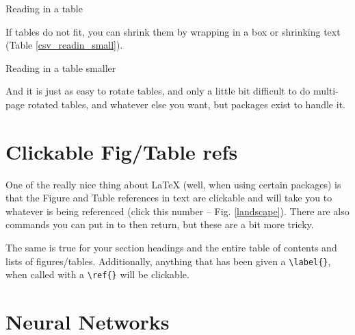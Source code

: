 \begin{table}[h]
\centering
\caption[Normal size table]{Reading in a table}
\label{csv_readin}
\end{table}

If tables do not fit, you can shrink them by wrapping in a box or shrinking text (Table \ref{csv_readin_small}).

\begin{table}[h]
\centering
\caption[Tiny table]{Reading in a table smaller}
\label{csv_readin_small}
\end{table}

And it is just as easy to rotate tables, and only a little bit difficult to do multi-page rotated tables, and whatever else you want, but packages exist to handle it. 

\clearpage %

\section{Clickable Fig/Table refs}

One of the really nice thing about \LaTeX{} (well, when using certain packages) is that the Figure and Table references in text are clickable and will take you to whatever is being referenced (click this number -- Fig. \ref{landscape}). There are also commands you can put in to then return, but these are a bit more tricky. 

The same is true for your section headings and the entire table of contents and lists of figures/tables. Additionally, anything that has been given a \verb+\label{}+, when called with a \verb+\ref{}+ will be clickable. 






\section{Neural Networks}
